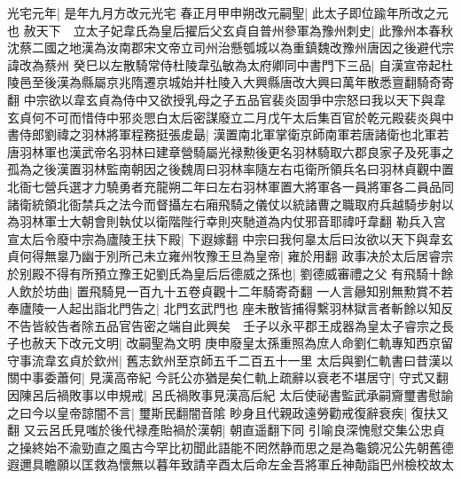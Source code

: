 光宅元年|{
	是年九月方改元光宅}
春正月甲申朔改元嗣聖|{
	此太子即位踰年所改之元也}
赦天下　立太子妃韋氏為皇后擢后父玄貞自普州參軍為豫州刺史|{
	此豫州本春秋沈蔡二國之地漢為汝南郡宋文帝立司州治懸瓠城以為重鎮魏改豫州唐因之後避代宗諱改為蔡州}
癸巳以左散騎常侍杜陵韋弘敏為太府卿同中書門下三品|{
	自漢宣帝起杜陵邑至後漢為縣屬京兆隋遷京城始并杜陵入大興縣唐改大興曰萬年散悉亶翻騎奇寄翻}
中宗欲以韋玄貞為侍中又欲授乳母之子五品官裴炎固爭中宗怒曰我以天下與韋玄貞何不可而惜侍中邪炎愳白太后密謀廢立二月戊午太后集百官於乾元殿裴炎與中書侍郎劉禕之羽林將軍程務挺張䖍朂|{
	漢置南北軍掌衛京師南軍若唐諸衛也北軍若唐羽林軍也漢武帝名羽林曰建章營騎屬光禄勲後更名羽林騎取六郡良家子及死事之孤為之後漢置羽林監南朝因之後魏周曰羽林率隨左右屯衛所領兵名曰羽林貞觀中置北衙七營兵選才力驍勇者充龍朔二年曰左右羽林軍置大將軍各一員將軍各二員品同諸衛統領北衙禁兵之法今而督攝左右廂飛騎之儀仗以統諸曹之職取府兵越騎步射以為羽林軍士大朝會則執仗以衛階陛行幸則夾馳道為内仗邪音耶禕吁韋翻}
勒兵入宫宣太后令廢中宗為廬陵王扶下殿|{
	下遐嫁翻}
中宗曰我何辠太后曰汝欲以天下與韋玄貞何得無辠乃幽于別所己未立雍州牧豫王旦為皇帝|{
	雍於用翻}
政事决於太后居睿宗於别殿不得有所預立豫王妃劉氏為皇后后德威之孫也|{
	劉德威審禮之父}
有飛騎十餘人飲於坊曲|{
	置飛騎見一百九十五卷貞觀十二年騎寄奇翻}
一人言曏知别無勲賞不若奉廬陵一人起出詣北門告之|{
	北門玄武門也}
座未散皆捕得繫羽林獄言者斬餘以知反不告皆絞告者除五品官告密之端自此興矣　壬子以永平郡王成器為皇太子睿宗之長子也赦天下改元文明|{
	改嗣聖為文明}
庚申廢皇太孫重照為庶人命劉仁軌專知西京留守事流韋玄貞於欽州|{
	舊志欽州至京師五千二百五十一里}
太后與劉仁軌書曰昔漢以關中事委蕭何|{
	見漢高帝紀}
今託公亦猶是矣仁軌上疏辭以衰老不堪居守|{
	守式又翻}
因陳呂后禍敗事以申規戒|{
	呂氏禍敗事見漢高后紀}
太后使祕書監武承嗣齎璽書慰諭之曰今以皇帝諒闇不言|{
	璽斯民翻闇音隂}
眇身且代親政遠勞勸戒復辭衰疾|{
	復扶又翻}
又云呂氏見嗤於後代禄產貽禍於漢朝|{
	朝直遥翻下同}
引喻良深愧慰交集公忠貞之操終始不渝勁直之風古今罕比初聞此語能不罔然静而思之是為龜鏡况公先朝舊德遐邇具瞻願以匡救為懷無以暮年致請辛酉太后命左金吾將軍丘神勣詣巴州檢校故太

